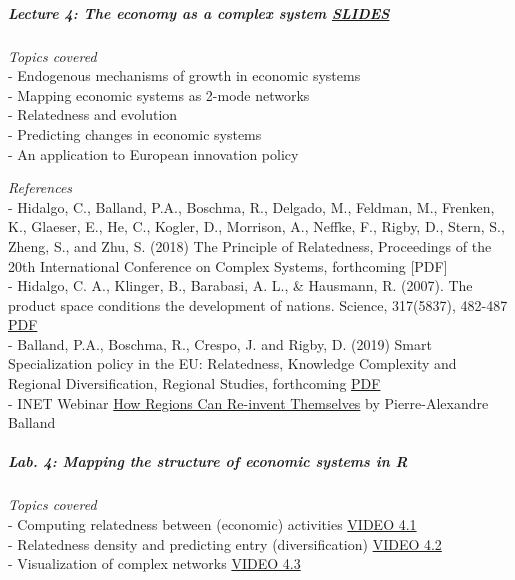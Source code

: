 \documentclass[
]{article}
\begin{document}
\hypertarget{lecture-4-the-economy-as-a-complex-system-slides}{%
\subparagraph{\texorpdfstring{\textbf{Lecture 4: The economy as a
complex system}
\href{https://github.com/PABalland/PABalland.github.io/raw/master/teaching/on/L4.pdf}{SLIDES}}{Lecture 4: The economy as a complex system SLIDES}}\label{lecture-4-the-economy-as-a-complex-system-slides}}

\emph{Topics covered}\\
- Endogenous mechanisms of growth in economic systems\\
- Mapping economic systems as 2-mode networks\\
- Relatedness and evolution\\
- Predicting changes in economic systems\\
- An application to European innovation policy

\emph{References}\\
- Hidalgo, C., Balland, P.A., Boschma, R., Delgado, M., Feldman, M.,
Frenken, K., Glaeser, E., He, C., Kogler, D., Morrison, A., Neffke, F.,
Rigby, D., Stern, S., Zheng, S., and Zhu, S. (2018) The Principle of
Relatedness, Proceedings of the 20th International Conference on Complex
Systems, forthcoming {[}PDF{]}\\
- Hidalgo, C. A., Klinger, B., Barabasi, A. L., \& Hausmann, R. (2007).
The product space conditions the development of nations. Science,
317(5837), 482-487 \href{http://barabasi.com/f/220.pdf}{PDF}\\
- Balland, P.A., Boschma, R., Crespo, J. and Rigby, D. (2019) Smart
Specialization policy in the EU: Relatedness, Knowledge Complexity and
Regional Diversification, Regional Studies, forthcoming
\href{https://2c2e773f-85c0-4039-818c-ea517fc75085.filesusr.com/ugd/c5611b_94433b170c40428d9fea06a58dcef6d1.pdf}{PDF}\\
- INET Webinar \href{https://www.youtube.com/watch?v=BmMTvj6IWRk}{How
Regions Can Re-invent Themselves} by Pierre-Alexandre Balland

\hypertarget{lab.-4-mapping-the-structure-of-economic-systems-in-r}{%
\subparagraph{\texorpdfstring{\textbf{Lab. 4: Mapping the structure of
economic systems in
R}}{Lab. 4: Mapping the structure of economic systems in R}}\label{lab.-4-mapping-the-structure-of-economic-systems-in-r}}

\emph{Topics covered}\\
- Computing relatedness between (economic) activities
\href{https://youtu.be/l5T0lGTQfWw}{VIDEO 4.1}\\
- Relatedness density and predicting entry (diversification)
\href{https://youtu.be/1G5bbk8ZXDA}{VIDEO 4.2}\\
- Visualization of complex networks
\href{https://youtu.be/rRK0o9GRCsg}{VIDEO 4.3}
\end{document}
